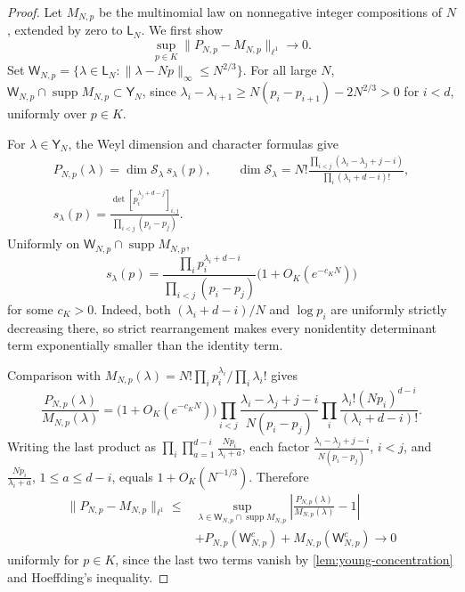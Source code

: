 \documentclass[11pt]{article}
\theoremstyle{remark}
\theoremstyle{plain}
\newcommand{\cS}{\mathcal S}
\begin{document}
\begin{proof}
Let \(M_{N,p}\) be the multinomial law on nonnegative integer
compositions of \(N\), extended by zero to \(\mathsf L_N\).  We first show
\begin{equation}\label{eq:young-multinomial-l1}
  \sup_{p\in K}\|P_{N,p}-M_{N,p}\|_{\ell^1}\longrightarrow0.
\end{equation}
Set \(\mathsf W_{N,p}=\{\lambda\in\mathsf L_N:
\|\lambda-Np\|_\infty\le N^{2/3}\}\).  For all large \(N\),
\(\mathsf W_{N,p}\cap\operatorname{supp}M_{N,p}\subset\mathsf Y_N\), since
\(\lambda_i-\lambda_{i+1}\ge N(p_i-p_{i+1})-2N^{2/3}>0\) for \(i<d\),
uniformly over \(p\in K\).

For \(\lambda\in\mathsf Y_N\), the Weyl dimension and character formulas
give
\[
\begin{gathered}
  P_{N,p}(\lambda)=\dim\cS_\lambda\,s_\lambda(p),\qquad
  \dim\cS_\lambda
  =N!\frac{\prod_{i<j}(\lambda_i-\lambda_j+j-i)}
  {\prod_i(\lambda_i+d-i)!},\\
  s_\lambda(p)
  =\frac{\det[p_i^{\lambda_j+d-j}]_{i,j}}
  {\prod_{i<j}(p_i-p_j)}.
\end{gathered}
\]
Uniformly on \(\mathsf W_{N,p}\cap\operatorname{supp}M_{N,p}\),
\[
  s_\lambda(p)
  =\frac{\prod_i p_i^{\lambda_i+d-i}}
  {\prod_{i<j}(p_i-p_j)}\bigl(1+O_K(e^{-c_KN})\bigr)
\]
for some \(c_K>0\).  Indeed, both \((\lambda_i+d-i)/N\) and
\(\log p_i\) are uniformly strictly decreasing there, so strict
rearrangement makes every nonidentity determinant term exponentially
smaller than the identity term.

Comparison with
\(M_{N,p}(\lambda)=N!\prod_i p_i^{\lambda_i}/\prod_i\lambda_i!\) gives
\[
  \frac{P_{N,p}(\lambda)}{M_{N,p}(\lambda)}
  =\bigl(1+O_K(e^{-c_KN})\bigr)
  \prod_{i<j}\frac{\lambda_i-\lambda_j+j-i}{N(p_i-p_j)}
  \prod_i\frac{\lambda_i!(Np_i)^{d-i}}{(\lambda_i+d-i)!}.
\]
Writing the last product as
\(\prod_i\prod_{a=1}^{d-i}\frac{Np_i}{\lambda_i+a}\), each factor
\(\frac{\lambda_i-\lambda_j+j-i}{N(p_i-p_j)}\), \(i<j\), and
\(\frac{Np_i}{\lambda_i+a}\), \(1\le a\le d-i\), equals
\(1+O_K(N^{-1/3})\).  Therefore
\[
\begin{aligned}
  \|P_{N,p}-M_{N,p}\|_{\ell^1}
  \le{}&\sup_{\lambda\in\mathsf W_{N,p}\cap\operatorname{supp}M_{N,p}}
       \left|\frac{P_{N,p}(\lambda)}{M_{N,p}(\lambda)}-1\right|\\
  &+P_{N,p}(\mathsf W_{N,p}^c)+M_{N,p}(\mathsf W_{N,p}^c)
  \longrightarrow0
\end{aligned}
\]
uniformly for \(p\in K\), since the last two terms vanish by
\cref{lem:young-concentration} and Hoeffding's inequality.


\end{proof}
\end{document}
